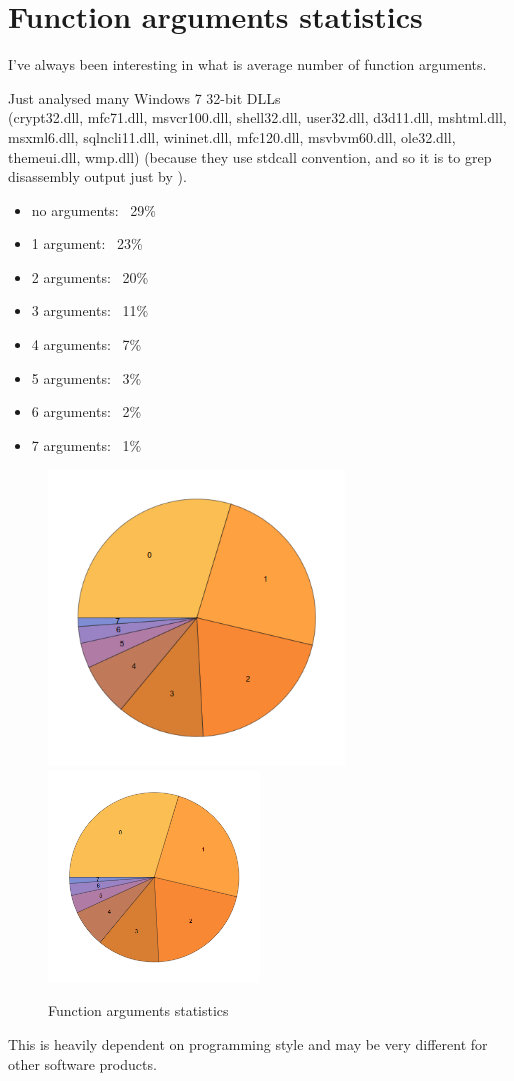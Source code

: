 \section{Function arguments statistics}
\label{args_stat}

I've always been interesting in what is average number of function arguments.

Just analysed many Windows 7 32-bit DLLs \\
(crypt32.dll, mfc71.dll, msvcr100.dll, shell32.dll, 
user32.dll, d3d11.dll, mshtml.dll, msxml6.dll, sqlncli11.dll, wininet.dll, mfc120.dll, msvbvm60.dll, ole32.dll, themeui.dll, wmp.dll) 
(because they use stdcall convention, and so it is to grep disassembly output just by ).

\begin{itemize}
\item no arguments: ~29\%
\item 1 argument: ~23\%
\item 2 arguments: ~20\%
\item 3 arguments: ~11\%
\item 4 arguments: ~7\%
\item 5 arguments: ~3\%
\item 6 arguments: ~2\%
\item 7 arguments: ~1\%
\end{itemize}

\begin{figure}[H]
\centering
\ifdefined\ebook
\includegraphics[width=0.7\textwidth]{other/args_stat.png}
\else
\includegraphics[width=0.5\textwidth]{other/args_stat.png}
\fi
\caption{Function arguments statistics}
\end{figure}

This is heavily dependent on programming style and may be very different for other software products.

